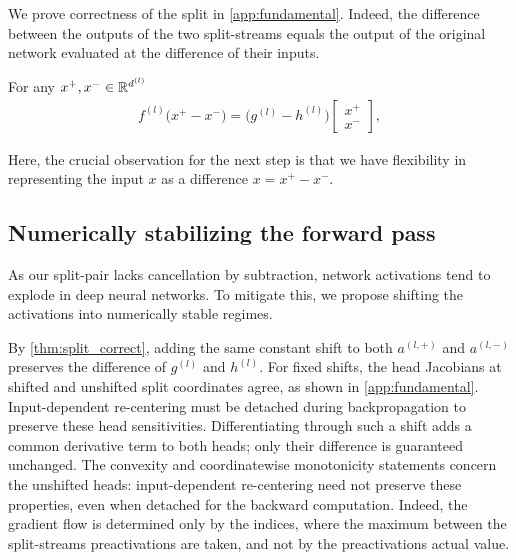 We prove correctness of the split in \cref{app:fundamental}.
Indeed, the difference between the outputs of the two split-streams equals the output of the original network evaluated at the difference of their inputs.

\begin{theorem}[Correctness] \label{thm:split_correct}
    For any $x^+, x^- \in \mathbb{R}^{d^{(l)}}$
    \begin{align*}
        f^{(l)} \bigl( x^+ - x^- \bigr)
            = \bigl( g^{(l)} - h^{(l)} \bigr)
                \begin{bmatrix}
                    x^+ \\
                    x^-
                \end{bmatrix},
    \end{align*}
\end{theorem}

Here, the crucial observation for the next step is that we have flexibility in representing the input $x$ as a difference $x = x^+ - x^-$.

\subsection{Numerically stabilizing the forward pass} \label{sec:forward}

As our split-pair lacks cancellation by subtraction, network activations tend to explode in deep neural networks. 
To mitigate this, we propose shifting the activations into numerically stable regimes.

By \cref{thm:split_correct},
adding the same constant shift to both \(a^{(l,+)}\) and \(a^{(l,-)}\) preserves the difference of $g^{(l)}$ and $h^{(l)}$.
For fixed shifts, the head Jacobians at shifted and unshifted split coordinates agree, as shown in \cref{app:fundamental}. Input-dependent re-centering must be detached during backpropagation to preserve these head sensitivities. Differentiating through such a shift adds a common derivative term to both heads; only their difference is guaranteed unchanged. The convexity and coordinatewise monotonicity statements concern the unshifted heads: input-dependent re-centering need not preserve these properties, even when detached for the backward computation. 
Indeed, the gradient flow is determined only by the indices, where the maximum between the split-streams preactivations are taken, and not by the preactivations actual value.
    
